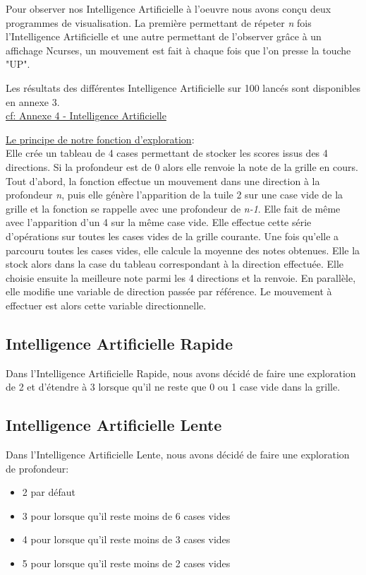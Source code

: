 \documentclass[a4paper]{article}
\begin{document}
 Pour observer nos Intelligence Artificielle à l'oeuvre nous avons
 conçu deux programmes de visualisation. La première permettant de
 répeter \emph{n} fois l'Intelligence Artificielle et une autre permettant
 de l'observer grâce à un affichage Ncurses, un mouvement est fait à
 chaque fois que l'on presse la touche "UP".


 Les résultats des différentes Intelligence Artificielle sur 100 lancés sont disponibles en annexe 3.\\
 \hyperref[sec-7-4]{cf: Annexe 4 - Intelligence Artificielle}

 \vspace{0.2cm}
 \noindent
 \underline{Le principe de notre fonction d'exploration}:\\
 Elle crée un tableau de 4 cases permettant de stocker les scores issus
 des 4 directions. Si la profondeur est de 0 alors elle renvoie la note
 de la grille en cours. Tout d'abord, la fonction effectue un mouvement
 dans une direction à la profondeur \emph{n}, puis elle génère l'apparition de 
 la tuile 2 sur une case vide de la grille et la fonction se rappelle 
 avec une profondeur de \emph{n-1}. Elle fait de même avec l'apparition d'un 4 
 sur la même case vide. Elle effectue cette série d'opérations sur toutes 
 les cases vides de la grille courante. Une fois qu'elle a parcouru toutes 
 les cases vides, elle calcule la moyenne des notes obtenues. Elle la stock 
 alors dans la case du tableau correspondant à la direction effectuée. 
 Elle choisie ensuite la meilleure note parmi les 4 directions et la renvoie. 
 En parallèle, elle modifie une variable de direction passée par référence. 
 Le mouvement à effectuer est alors cette variable directionnelle.


 \subsection{Intelligence Artificielle Rapide}
 \label{sec-5-1}
 Dans l'Intelligence Artificielle Rapide, nous avons décidé de faire une 
 exploration de 2 et d'étendre à 3 lorsque qu'il ne reste que 0 ou 1 case 
 vide dans la grille.

 \noindent

 \subsection{Intelligence Artificielle Lente}
 \label{sec-5-2}
 Dans l'Intelligence Artificielle Lente, nous avons décidé de faire
 une exploration de profondeur:
 \begin{itemize}
 \item 2 par défaut
 \item 3 pour lorsque qu'il reste moins de 6 cases vides
 \item 4 pour lorsque qu'il reste moins de 3 cases vides
 \item 5 pour lorsque qu'il reste moins de 2 cases vides
 \end{itemize}
\end{document}
